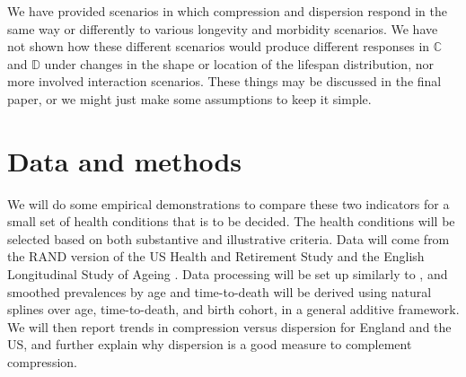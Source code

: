 \documentclass{article}
\begin{document}
We have provided scenarios in which compression and dispersion respond
in the same way or differently to various longevity and morbidity scenarios. We
have not shown how these different scenarios would produce different
responses in $\mathbb{C}$ and $\mathbb{D}$ under changes in the
shape or location of the lifespan distribution, nor more involved
interaction scenarios. These things may be discussed in the final paper, or we
might just make some assumptions to keep it simple.
\FloatBarrier
\section*{Data and methods}
We will do some empirical demonstrations to compare these two indicators for a
small set of health conditions that is to be decided. The health conditions will
be selected based on both substantive and illustrative criteria. Data will come
from the RAND version of the US Health and Retirement Study \citep{HRS} and
the English Longitudinal Study of Ageing \citep{steptoe2012cohort}. Data
processing will be set up similarly to \citet{riffe2017ttd}, and smoothed
prevalences by age and time-to-death will be derived using natural splines
over age, time-to-death, and birth cohort, in a general additive framework. We
will then report trends in compression versus dispersion for England and the US,
and further explain why dispersion is a good measure to complement compression.

    
\end{document}

